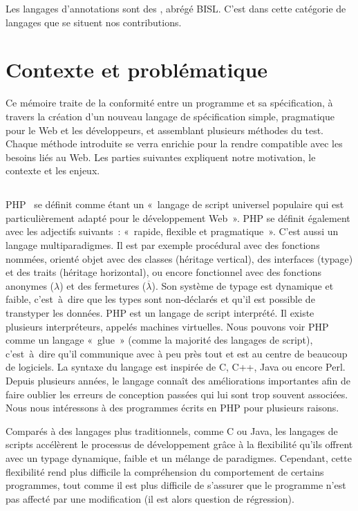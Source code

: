 Les langages d'annotations sont des , abrégé BISL. C'est dans cette catégorie de langages que
se situent nos contributions.

\section{Contexte et problématique}

Ce mémoire traite de la conformité entre un programme et sa spécification, à
travers la création d'un nouveau langage de spécification simple, pragmatique
pour le Web et les développeurs, et assemblant plusieurs méthodes du test.
Chaque méthode introduite se verra enrichie pour la rendre compatible avec les
besoins liés au Web. Les parties suivantes expliquent notre motivation, le
contexte et les enjeux.

\subsection{}

PHP~ se définit comme étant un «~langage de script universel
populaire qui est particulièrement adapté pour le développement Web~». PHP se
définit également avec les adjectifs suivants~: «~rapide, flexible et
pragmatique~». C'est aussi un langage multiparadigmes. Il est par exemple
procédural avec des fonctions nommées, orienté objet avec des classes (héritage
vertical), des interfaces (typage) et des traits (héritage horizontal), ou
encore fonctionnel avec des fonctions anonymes ($\lambda$) et des fermetures
($\overline{\lambda}$). Son système de typage est dynamique et faible,
c'est~à~dire que les types sont non-déclarés et qu'il est possible de transtyper
les données. PHP est un langage de script interprété. Il existe plusieurs
interpréteurs, appelés machines virtuelles. Nous pouvons voir PHP comme un
langage «~glue~» (comme la majorité des langages de script), c'est~à~dire qu'il
communique avec à peu près tout et est au centre de beaucoup de logiciels. La
syntaxe du langage est inspirée de C, C++, Java ou encore Perl.  Depuis
plusieurs années, le langage connaît des améliorations importantes afin de faire
oublier les erreurs de conception passées qui lui sont trop souvent associées.
Nous nous intéressons à des programmes écrits en PHP pour plusieurs raisons.

Comparés à des langages plus traditionnels, comme C ou Java, les langages de
scripts accélèrent le processus de développement grâce à la flexibilité qu'ils
offrent avec un typage dynamique, faible et un mélange de paradigmes. Cependant,
cette flexibilité rend plus difficile la compréhension du comportement de
certains programmes, tout comme il est plus difficile de s'assurer que le
programme n'est pas affecté par une modification (il est alors question de
régression).

